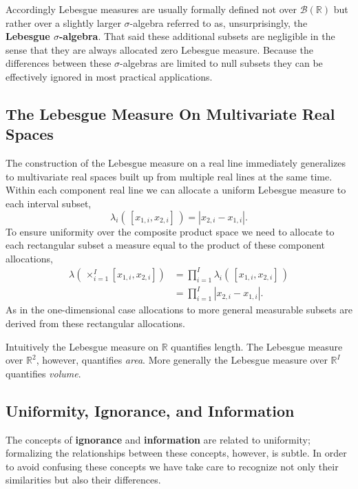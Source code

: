 \documentclass[
  letterpaper,
  DIV=11,
  numbers=noendperiod]{scrartcl}
\begin{document}
Accordingly Lebesgue measures are usually formally defined not over
\(\mathcal{B}(\mathbb{R})\) but rather over a slightly larger
\(\sigma\)-algebra referred to as, unsurprisingly, the \textbf{Lebesgue
\(\sigma\)-algebra}. That said these additional subsets are negligible
in the sense that they are always allocated zero Lebesgue measure.
Because the differences between these \(\sigma\)-algebras are limited to
null subsets they can be effectively ignored in most practical
applications.

\hypertarget{the-lebesgue-measure-on-multivariate-real-spaces}{%
\subsection{The Lebesgue Measure On Multivariate Real
Spaces}\label{the-lebesgue-measure-on-multivariate-real-spaces}}

The construction of the Lebesgue measure on a real line immediately
generalizes to multivariate real spaces built up from multiple real
lines at the same time. Within each component real line we can allocate
a uniform Lebesgue measure to each interval subset, \[
\lambda_{i}( \, [x_{1, i}, x_{2, i}] \, )
= | x_{2, i} - x_{1, i} |.
\] To ensure uniformity over the composite product space we need to
allocate to each rectangular subset a measure equal to the product of
these component allocations, \begin{align*}
\lambda( \, \times_{i = 1}^{I} [ x_{1, i}, x_{2, i} ] )
&=
\prod_{i = 1}^{I} \lambda_{i}( \, [x_{1, i}, x_{2, i}] \, )
\\
&=
\prod_{i = 1}^{I} | x_{2, i} - x_{1, i} |.
\end{align*} As in the one-dimensional case allocations to more general
measurable subsets are derived from these rectangular allocations.

Intuitively the Lebesgue measure on \(\mathbb{R}\) quantifies length.
The Lebesgue measure over \(\mathbb{R}^{2}\), however, quantifies
\emph{area}. More generally the Lebesgue measure over \(\mathbb{R}^{I}\)
quantifies \emph{volume}.

\hypertarget{uniformity-ignorance-and-information}{%
\subsection{Uniformity, Ignorance, and
Information}\label{uniformity-ignorance-and-information}}

The concepts of \textbf{ignorance} and \textbf{information} are related
to uniformity; formalizing the relationships between these concepts,
however, is subtle. In order to avoid confusing these concepts we have
take care to recognize not only their similarities but also their
differences.
\end{document}
